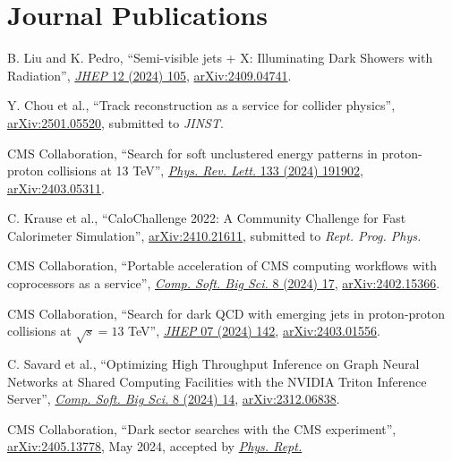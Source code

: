 \section{Journal Publications}
\begin{description}[leftmargin=12pt,font=\normalfont,labelsep=0em]
\item \begin{sloppypar}B. Liu and K. Pedro, ``Semi-visible jets + X: Illuminating Dark Showers with Radiation'', \href{https://doi.org/10.1007/JHEP12(2024)105}{\emph{JHEP} 12 (2024) 105}, \href{https://arxiv.org/abs/2409.04741}{arXiv:2409.04741}.\end{sloppypar} %
\item Y. Chou et al., ``Track reconstruction as a service for collider physics'', \href{https://arxiv.org/abs/2501.05520}{arXiv:2501.05520}, submitted to \emph{JINST}. %
\item CMS Collaboration, ``Search for soft unclustered energy patterns in proton-proton collisions at 13 TeV'', \href{http://dx.doi.org/10.1103/PhysRevLett.133.191902}{\emph{Phys. Rev. Lett.} 133 (2024) 191902}, \href{https://arxiv.org/abs/2403.05311}{arXiv:2403.05311}. %
\item C. Krause et al., ``CaloChallenge 2022: A Community Challenge for Fast Calorimeter Simulation'', \href{https://arxiv.org/abs/2410.21611}{arXiv:2410.21611}, submitted to \emph{Rept. Prog. Phys.} %
\item CMS Collaboration, ``Portable acceleration of CMS computing workflows with coprocessors as a service'', \href{https://doi.org/10.1007/s41781-024-00124-1}{\emph{Comp. Soft. Big Sci.} 8 (2024) 17}, \href{https://arxiv.org/abs/2402.15366}{arXiv:2402.15366}. %
\item CMS Collaboration, ``Search for dark QCD with emerging jets in proton-proton collisions at $\sqrt{s} = 13$ TeV'', \href{https://doi.org/10.1007/JHEP07(2024)142}{\emph{JHEP} 07 (2024) 142}, \href{https://arxiv.org/abs/2403.01556}{arXiv:2403.01556}. %
\item C. Savard et al., ``Optimizing High Throughput Inference on Graph Neural Networks at Shared Computing Facilities with the NVIDIA Triton Inference Server'', \href{http://doi.org/10.1007/s41781-024-00123-2}{\emph{Comp. Soft. Big Sci.} 8 (2024) 14}, \href{https://arxiv.org/abs/2312.06838}{arXiv:2312.06838}. %
\item CMS Collaboration, ``Dark sector searches with the CMS experiment'', \href{https://arxiv.org/abs/2405.13778}{arXiv:2405.13778}, May 2024, accepted by \href{https://doi.org/10.1016/j.physrep.2024.09.013}{\emph{Phys. Rept.}} %

\end{description}
